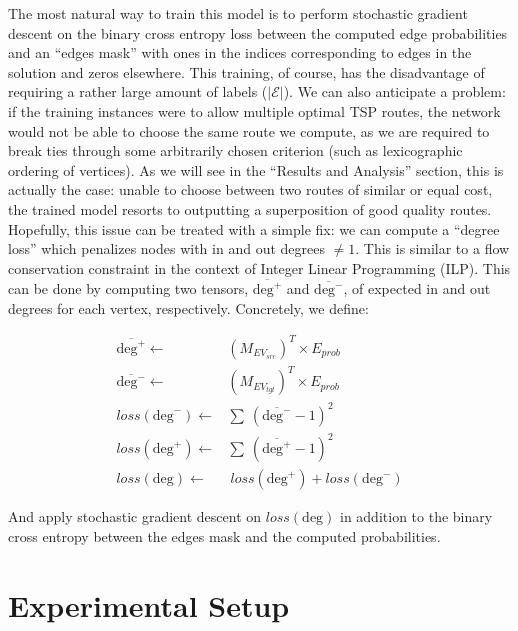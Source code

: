 \documentclass{article}
\begin{document}
The most natural way to train this model is to perform stochastic gradient descent on the binary cross entropy loss between the computed edge probabilities and an ``edges mask'' with ones in the indices corresponding to edges in the solution and zeros elsewhere. This training, of course, has the disadvantage of requiring a rather large amount of labels ($|\mathcal{E}|$). We can also anticipate a problem: if the training instances were to allow multiple optimal TSP routes, the network would not be able to choose the same route we compute, as we are required to break ties through some arbitrarily chosen criterion (such as lexicographic ordering of vertices). As we will see in the ``Results and Analysis'' section, this is actually the case: unable to choose between two routes of similar or equal cost, the trained model resorts to outputting a superposition of good quality routes. Hopefully, this issue can be treated with a simple fix: we can compute a ``degree loss'' which penalizes nodes with in and out degrees $\neq 1$. This is similar to a flow conservation constraint in the context of Integer Linear Programming (ILP). This can be done by computing two tensors, $\overline{\textrm{deg}^{+}}$ and $\overline{\textrm{deg}^{-}}$, of expected in and out degrees for each vertex, respectively. Concretely, we define:

\begin{equation}
\begin{aligned}
\overline{\textrm{deg}^{+}} \leftarrow & \left(M_{EV_{src}}\right)^T \times E_{prob} \\
\overline{\textrm{deg}^{-}} \leftarrow & \left(M_{EV_{tgt}}\right)^T \times E_{prob} \\
loss(\textrm{deg}^{-}) \leftarrow & \sum~(\overline{\textrm{deg}^{-}}-1)^2 \\
loss(\textrm{deg}^{+}) \leftarrow & \sum~(\overline{\textrm{deg}^{+}}-1)^2 \\
loss(\textrm{deg}) \leftarrow & ~loss(\textrm{deg}^{+}) + loss(\textrm{deg}^{-})
\end{aligned}
\end{equation}

And apply stochastic gradient descent on $loss(\textrm{deg})$ in addition to the binary cross entropy between the edges mask and the computed probabilities.

\section{Experimental Setup}
\end{document}
